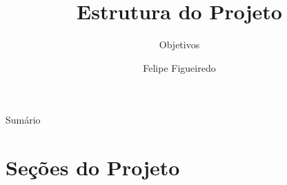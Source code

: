 \documentclass{beamer}
\title%
{Estrutura do Projeto}
\subtitle
{Objetivos} %
\author%
{Felipe Figueiredo}%
\institute[INTO] %
{Instituto Nacional de Traumatologia e Ortopedia
}
\date%
{}
\begin{document}
\begin{frame}
  \titlepage
\end{frame}

\begin{frame}{Sumário}
  \tableofcontents
\end{frame}








\section{Seções do Projeto}
\end{document}
